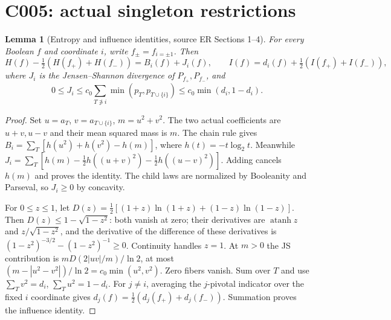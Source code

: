 \documentclass[11pt]{article}
\newtheorem{lemma}{Lemma}
\begin{document}
\section{C005: actual singleton restrictions}
\begin{lemma}[Entropy and influence identities, source ER Sections 1--4]
\label{lem:single}
For every Boolean $f$ and coordinate $i$, write $f_\pm=f_{i=\pm1}$.
Then
\[
H(f)-\tfrac12(H(f_+)+H(f_-))=B_i(f)+J_i(f),\qquad
I(f)=d_i(f)+\tfrac12(I(f_+)+I(f_-)),
\]
where $J_i$ is the Jensen--Shannon divergence of $P_{f_+},P_{f_-}$,
and
\[
0\le J_i\le c_0\sum_{T\not\ni i}\min(p_T,p_{T\cup\{i\}})
             \le c_0\min(d_i,1-d_i).
\]
\end{lemma}
\begin{proof}
Set $u=a_T$, $v=a_{T\cup\{i\}}$, $m=u^2+v^2$.
The two actual coefficients are $u+v,u-v$ and their mean squared
mass is $m$. The chain rule gives
$B_i=\sum_T[h(u^2)+h(v^2)-h(m)]$, where $h(t)=-t\log_2t$.
Meanwhile
$J_i=\sum_T[h(m)-\tfrac12h((u+v)^2)-\tfrac12h((u-v)^2)]$.
Adding cancels $h(m)$ and proves the identity. The child laws are
normalized by Booleanity and Parseval, so $J_i\ge0$ by concavity.

For $0\le z\le1$, let
$D(z)=\tfrac12[(1+z)\ln(1+z)+(1-z)\ln(1-z)]$.
Then $D(z)\le1-\sqrt{1-z^2}$: both vanish at zero;
their derivatives are $\operatorname{atanh}z$ and
$z/\sqrt{1-z^2}$, and the derivative of the difference of these
derivatives is $(1-z^2)^{-3/2}-(1-z^2)^{-1}\ge0$.
Continuity handles $z=1$.
At $m>0$ the JS contribution is $mD(2|uv|/m)/\ln2$,
at most $(m-|u^2-v^2|)/\ln2=c_0\min(u^2,v^2)$.
Zero fibers vanish. Sum over $T$ and use
$\sum_Tv^2=d_i$, $\sum_Tu^2=1-d_i$.
For $j\ne i$, averaging the $j$-pivotal indicator over the fixed
$i$ coordinate gives $d_j(f)=\tfrac12(d_j(f_+)+d_j(f_-))$.
Summation proves the influence identity.
\end{proof}
\end{document}
